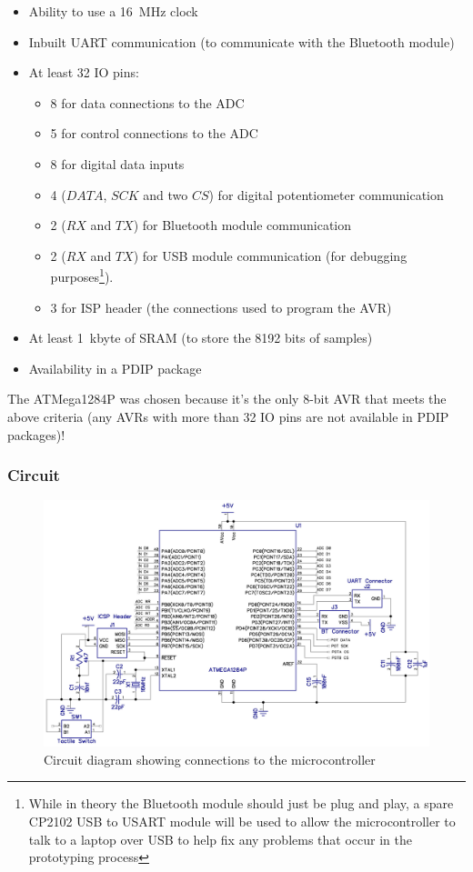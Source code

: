 \begin{itemize}
  \item Ability to use a \SI{16}{\MHz} clock
  \item Inbuilt UART communication (to communicate with the Bluetooth module)
  \item At least 32 IO pins:
    \begin{itemize}
      \item 8 for data connections to the ADC
      \item 5 for control connections to the ADC
      \item 8 for digital data inputs
      \item 4 ($DATA$, $SCK$ and two $CS$) for digital potentiometer
        communication
      \item 2 ($RX$ and $TX$) for Bluetooth module communication
      \item 2 ($RX$ and $TX$) for USB module communication (for debugging
        purposes\footnote{While in theory the Bluetooth module should just be
          plug and play, a spare CP2102 USB to USART module will be used to
          allow the microcontroller to talk to a laptop over USB to help fix any
          problems that occur in the prototyping process}).
      \item 3 for ISP header (the connections used to program the AVR)
    \end{itemize}
  \item At least \SI{1}{\kilo byte} of SRAM (to store the 8192 bits of samples)
  \item Availability in a PDIP package
\end{itemize}

The ATMega1284P was chosen because it's the only 8-bit AVR that meets the above
criteria (any AVRs with more than 32 IO pins are not available in PDIP
packages)!

\subsubsection{Circuit}

\begin{figure}[h]
  \includegraphics[width=\textwidth]{img/microcontroller/circuit.png}
  \caption[Microcontroller Circuit Diagram]{Circuit diagram showing connections to the microcontroller}
  \label{fig:microcontrollerCircuitDiagram}
\end{figure}


